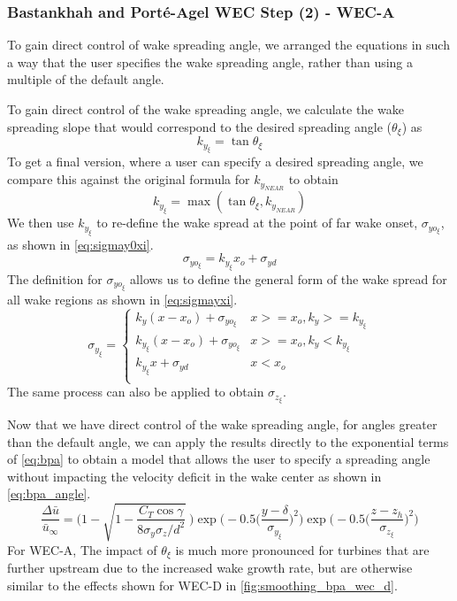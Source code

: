 \documentclass{jpconf}
\begin{document}
\subsubsection{Bastankhah and Port\'e-Agel WEC Step (2) - WEC-A}
To gain direct control of wake spreading angle, we arranged the equations in such a way that the user specifies the wake spreading angle, rather than using a multiple of the default angle. 

To gain direct control of the wake spreading angle, we calculate the wake spreading slope that would correspond to the desired spreading angle ($\theta_\xi$) as
%
\begin{equation}
	k_{y_{\xi}} = \tan{\theta_\xi}
\end{equation}
%
To get a final version, where a user can specify a desired spreading angle, we compare this against the original formula for $k_{y_{NEAR}}$ to obtain
%
\begin{equation}
	k_{y_{\xi}} = \max(\tan{\theta_\xi}, k_{y_{NEAR}})
\end{equation}
%
We then use $k_{y_{\xi}}$ to re-define the wake spread at the point of far wake onset, $\sigma_{yo_{\xi}}$, as shown in \cref{eq:sigmay0xi}.
%
\begin{equation}\label{eq:sigmay0xi}
	\sigma_{yo_{\xi}} = k_{y_{\xi}}x_o+\sigma_{yd}
\end{equation}
%
The definition for $\sigma_{yo_{\xi}}$ allows us to define the general form of the wake spread for all wake regions as shown in \cref{eq:sigmayxi}. 
%
\begin{equation}\label{eq:sigmayxi}
	\sigma_{y_{\xi}} =
	\begin{cases} k_y (x-x_o)+\sigma_{yo_{\xi}} & x >= x_o, k_y >= k_{y_{\xi}} \\
		k_{y_{\xi}} (x-x_o)+\sigma_{yo_{\xi}} & x >= x_o, k_y < k_{y_{\xi}} \\
		k_{y_{\xi}}x+\sigma_{yd} & x < x_o \\
	\end{cases}
\end{equation}
%
The same process can also be applied to obtain $\sigma_{z_{\xi}}$. 

Now that we have direct control of the wake spreading angle, for angles greater than the default angle, we can apply the results directly to the exponential terms of \cref{eq:bpa} to obtain a model that allows the user to specify a spreading angle without impacting the velocity deficit in the wake center as shown in \cref{eq:bpa_angle}.
\begin{equation}
	\frac{\Delta \bar{u}}{\bar{u}_{\infty}} = \Bigg(1-\sqrt{1-\frac{C_T \cos{\gamma}}{8 \sigma_y \sigma_z/d^2}}~\Bigg) \exp{\bigg(-0.5\Big(\frac{y-\delta}{\sigma_{y_{\xi}}}\Big)^2\bigg)}\exp{\bigg(-0.5\Big(\frac{z-z_h}{\sigma_{z_{\xi}}}\Big)^2\bigg)}
	\label{eq:bpa_angle}
\end{equation}
%
For WEC-A, The impact of $\theta_\xi$ is much more pronounced for turbines that are further upstream due to the increased wake growth rate, but are otherwise similar to the effects shown for WEC-D in \cref{fig:smoothing_bpa_wec_d}.
\end{document}

